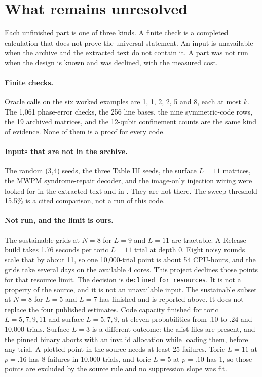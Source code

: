 \section{What remains unresolved}
Each unfinished part is one of three kinds. A finite check is a completed calculation that does not prove the universal statement. An input is unavailable when the archive and the extracted text do not contain it. A part was not run when the design is known and was declined, with the measured cost.
\paragraph{Finite checks.} Oracle calls on the six worked examples are 1, 1, 2, 2, 5 and 8, each at most $k$. The 1,061 phase-error checks, the 256 line bases, the nine symmetric-code rows, the 19 archived matrices, and the 12-qubit confinement counts are the same kind of evidence. None of them is a proof for every code.
\paragraph{Inputs that are not in the archive.} The random (3,4) seeds, the three Table III seeds, the surface $L=11$ matrices, the MWPM syndrome-repair decoder, and the image-only injection wiring were looked for in the extracted text and in . They are not there. The sweep threshold 15.5\% is a cited comparison, not a run of this code.
\paragraph{Not run, and the limit is ours.} The sustainable grids at $N=8$ for $L=9$ and $L=11$ are tractable. A Release build takes 1.76 seconds per toric $L=11$ trial at depth 0. Eight noisy rounds scale that by about 11, so one 10,000-trial point is about 54 CPU-hours, and the grids take several days on the available 4 cores. This project declines those points for that resource limit. The decision is \texttt{declined for resources}. It is not a property of the source, and it is not an unavailable input. The sustainable subset at $N=8$ for $L=5$ and $L=7$ has finished and is reported above. It does not replace the four published estimates. Code capacity finished for toric $L=5,7,9,11$ and surface $L=5,7,9$, at eleven probabilities from .10 to .24 and 10,000 trials. Surface $L=3$ is a different outcome: the alist files are present, and the pinned binary aborts with an invalid allocation while loading them, before any trial. A plotted point in the source needs at least 25 failures. Toric $L=11$ at $p=.16$ has 8 failures in 10,000 trials, and toric $L=5$ at $p=.10$ has 1, so those points are excluded by the source rule and no suppression slope was fit.
